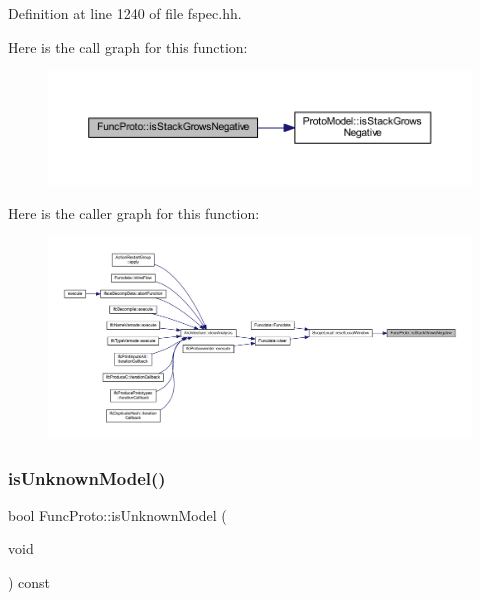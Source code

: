 Definition at line 1240 of file fspec.\+hh.

Here is the call graph for this function\+:
\nopagebreak
\begin{figure}[H]
\begin{center}
\leavevmode
\includegraphics[width=350pt]{class_func_proto_a2cb0c5a60d2cfd70462d8e9f75aa9819_cgraph}
\end{center}
\end{figure}
Here is the caller graph for this function\+:
\nopagebreak
\begin{figure}[H]
\begin{center}
\leavevmode
\includegraphics[width=350pt]{class_func_proto_a2cb0c5a60d2cfd70462d8e9f75aa9819_icgraph}
\end{center}
\end{figure}
\mbox{\label{class_func_proto_ac002aea4a1495011c1a577d343755c21}} 
\subsubsection{\texorpdfstring{isUnknownModel()}{isUnknownModel()}}
{\footnotesize\ttfamily bool Func\+Proto\+::is\+Unknown\+Model (\begin{DoxyParamCaption}\item[{void}]{ }\end{DoxyParamCaption}) const\hspace{0.3cm}{\ttfamily [inline]}}




